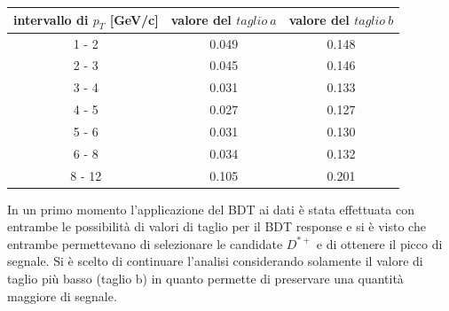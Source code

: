 \begin{table}[H]
		\centering
		\begin{tabular}{c|c|c}
		    \toprule
		    intervallo di $p_T$ [GeV/c]  &  valore del $taglio \ a$ & valore del $taglio \ b$ \\
            \midrule
           	1 - 2  	&    0.049  &   0.148\\ 
            2 - 3 	&    0.045  &   0.146\\ 
            3 - 4  	&    0.031  &   0.133\\ 
            4 - 5  	&    0.027  &   0.127\\ 
            5 - 6  	&    0.031  &   0.130\\ 
            6 - 8  	&    0.034  &   0.132\\ 
            8 - 12  &    0.105  &   0.201\\   
			\bottomrule
		\end{tabular}
	\end{table}
	
In un primo momento l'applicazione del BDT ai dati è stata effettuata con entrambe le possibilità di valori di taglio per il BDT response e si è visto che entrambe permettevano di selezionare le candidate $D^{*+}$ e di ottenere il picco di segnale. Si \`e scelto di continuare l'analisi considerando solamente il valore di taglio più basso (taglio b) in quanto permette di preservare una quantit\`a maggiore di segnale.  


  
  

